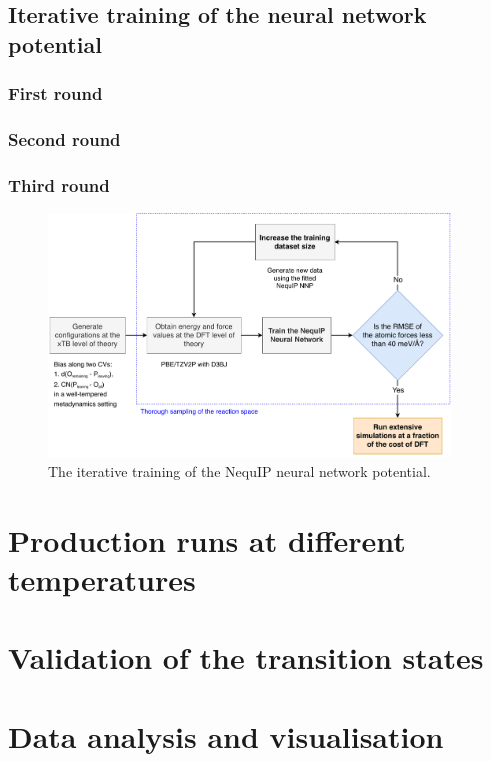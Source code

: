 \subsection{Iterative training of the neural network potential}

\subsubsection{First round}

\subsubsection{Second round}

\subsubsection{Third round}
\begin{figure}[h]
    \centering
    \includegraphics[width=0.95\textwidth]{Figures/3_Computational_details/workflow_diagram_helvetica_updated.pdf}
    \caption{The iterative training of the NequIP neural network potential.}
    \label{fig:iterative-training}
\end{figure}


\section{Production runs at different temperatures}



\section{Validation of the transition states}



\section{Data analysis and visualisation}